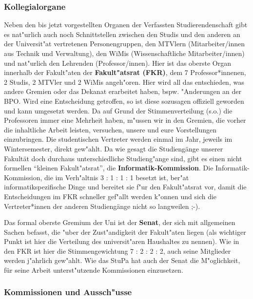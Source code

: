 \subsubsection*{Kollegialorgane}

Neben den bis jetzt vorgestellten Organen der Verfassten Studierendenschaft 
gibt es nat"urlich auch noch Schnittstellen zwischen den Studis und den anderen 
an der Universit"at vertretenen Personengruppen, den MTVlern (Mitarbeiter/innen 
aus Technik und Verwaltung), den WiMis (Wissenschaftliche Mitarbeiter/innen) und nat"urlich den Lehrenden (Professor/innen). Hier ist das 
oberste Organ innerhalb der Fakult"aten der \textbf{Fakult"atsrat (FKR)}, 
dem 7 Professor*innenen, 2 Studis, 2 MTVler und 2 WiMis angeh"oren. Hier wird all das 
entschieden, was andere Gremien oder das Dekanat erarbeitet haben, bspw. 
"Anderungen an der BPO. Wird eine Entscheidung getroffen, so ist diese 
sozusagen offiziell geworden und kann umgesetzt werden. Da auf Grund der 
Stimmenverteilung (s.o.) die Professoren immer eine Mehrheit haben, m"ussen wir 
in den Gremien, die vorher die inhaltliche Arbeit leisten, versuchen, unsere 
und eure Vorstellungen einzubringen. Die studentischen 
Vertreter werden einmal im Jahr, jeweils im Wintersemester, direkt gew"ahlt. Da 
wie gesagt die Studiengänge unserer Fakultät doch durchaus unterschiedliche 
Studieng"ange sind, gibt es einen nicht formellen "`kleinen Fakult"atsrat"', 
die \textbf{Informatik-Kommission}. Die Informatik-Kommission, die im 
Verh"altnis 3 : 1 : 1 : 1 besetzt ist, ber"at informatikspezifische Dinge und 
bereitet sie f"ur den Fakult"atsrat vor, damit die Entscheidungen im FKR 
schneller gef"allt werden k"onnen und sich die Vertreter*innen der anderen Studiengänge nicht so langweilen 
;-).

Das formal oberste Gremium der Uni ist der \textbf{Senat}, der sich mit 
allgemeinen Sachen befasst, die "uber der Zust"andigkeit der Fakult"aten 
liegen (als wichtiger Punkt ist hier die Verteilung des universit"aren 
Haushaltes zu nennen). Wie in den FKR ist hier die Stimmengewichtung 7 : 2 : 2 
: 2, auch seine Mitglieder werden j"ahrlich gew"ahlt. Wie das StuPa hat auch der 
Senat die M"oglichkeit, für seine Arbeit unterst"utzende Kommissionen einzusetzen.

\subsubsection*{Kommissionen und Aussch"usse}

